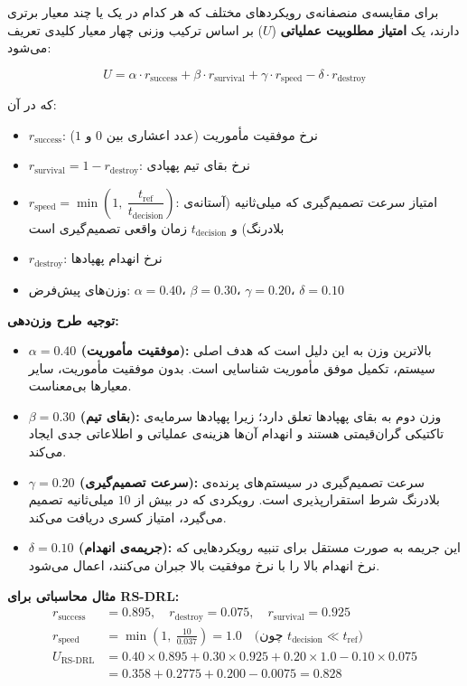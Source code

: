 \documentclass[oneside,openany,a4paper,12pt]{article}
\begin{document}
برای مقایسه‌ی منصفانه‌ی رویکردهای مختلف که هر کدام در یک یا چند معیار برتری دارند، یک \textbf{امتیاز مطلوبیت عملیاتی} ($U$) بر اساس ترکیب وزنی چهار معیار کلیدی تعریف می‌شود:

\begin{equation}
U = \alpha \cdot r_{\text{success}} + \beta \cdot r_{\text{survival}} + \gamma \cdot r_{\text{speed}} - \delta \cdot r_{\text{destroy}}
\label{eq:utility}
\end{equation}

که در آن:
\begin{itemize}
    \item $r_{\text{success}}$: نرخ موفقیت مأموریت (عدد اعشاری بین $0$ و $1$)
    \item $r_{\text{survival}} = 1 - r_{\text{destroy}}$: نرخ بقای تیم پهپادی
    \item $r_{\text{speed}} = \min\!\left(1,\ \dfrac{t_{\text{ref}}}{t_{\text{decision}}}\right)$: امتیاز سرعت تصمیم‌گیری که  میلی‌ثانیه (آستانه‌ی بلادرنگ) و $t_{\text{decision}}$ زمان واقعی تصمیم‌گیری است
    \item $r_{\text{destroy}}$: نرخ انهدام پهپادها
    \item وزن‌های پیش‌فرض: $\alpha = 0.40$، $\beta = 0.30$، $\gamma = 0.20$، $\delta = 0.10$
\end{itemize}

\textbf{توجیه طرح وزن‌دهی:}
\begin{itemize}
    \item \textbf{$\alpha = 0.40$ (موفقیت مأموریت):} بالاترین وزن به این دلیل است که هدف اصلی سیستم، تکمیل موفق مأموریت شناسایی است. بدون موفقیت مأموریت، سایر معیارها بی‌معناست.
    \item \textbf{$\beta = 0.30$ (بقای تیم):} وزن دوم به بقای پهپادها تعلق دارد؛ زیرا پهپادها سرمایه‌ی تاکتیکی گران‌قیمتی هستند و انهدام آن‌ها هزینه‌ی عملیاتی و اطلاعاتی جدی ایجاد می‌کند.
    \item \textbf{$\gamma = 0.20$ (سرعت تصمیم‌گیری):} سرعت تصمیم‌گیری در سیستم‌های پرنده‌ی بلادرنگ شرط استقرارپذیری است. رویکردی که در بیش از $10$ میلی‌ثانیه تصمیم می‌گیرد، امتیاز کسری دریافت می‌کند.
    \item \textbf{$\delta = 0.10$ (جریمه‌ی انهدام):} این جریمه به صورت مستقل برای تنبیه رویکردهایی که نرخ انهدام بالا را با نرخ موفقیت بالا جبران می‌کنند، اعمال می‌شود.
\end{itemize}

\textbf{مثال محاسباتی برای RS-DRL:}
\begin{align*}
r_{\text{success}} &= 0.895, \quad r_{\text{destroy}} = 0.075, \quad r_{\text{survival}} = 0.925 \\
r_{\text{speed}} &= \min\!\left(1,\ \frac{10}{0.037}\right) = 1.0 \quad \text{(چون $t_{\text{decision}} \ll t_{\text{ref}}$)} \\
U_{\text{RS-DRL}} &= 0.40 \times 0.895 + 0.30 \times 0.925 + 0.20 \times 1.0 - 0.10 \times 0.075 \\
&= 0.358 + 0.2775 + 0.200 - 0.0075 = \mathbf{0.828}
\end{align*}
\end{document}
